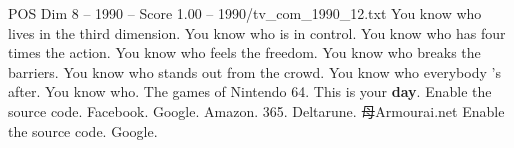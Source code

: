 \begin{textsample}{POS Dim 8 – 1990 – Score 1.00 – 1990/tv\_com\_1990\_12.txt}  \label{ex:f8_pos_080}
You know who lives in the third dimension.
You know who is in control.
You know who has four times the action.
You know who feels the freedom.
You know who breaks the barriers.
You know who stands out from the crowd.
You know who everybody 's after.
You know who.
The games of Nintendo 64.
This is your \textbf{day}.
Enable the source code.
Facebook.
Google.
Amazon. 365.
Deltarune. 母Armourai.net Enable the source code.
Google.

\end{textsample}
